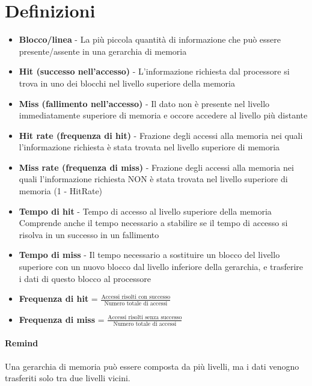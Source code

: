 \documentclass[12pt, a4paper, openany]{book}
\begin{document}
\section{Definizioni}
\begin{itemize}
    \item \textbf{Blocco/linea} - La più piccola quantità di informazione che può essere presente/assente in una gerarchia
    di memoria
    \item \textbf{Hit (successo nell'accesso)} - L'informazione richiesta dal processore si trova in uno dei 
    blocchi nel livello superiore della memoria
    \item \textbf{Miss (fallimento nell'accesso)} - Il dato non è presente nel livello immediatamente superiore
    di memoria e occore accedere al livello più distante
    \item \textbf{Hit rate (frequenza di hit)} - Frazione degli accessi alla memoria nei quali l'informazione
    richiesta è stata trovata nel livello superiore di memoria
    \item \textbf{Miss rate (frequenza di miss)} - Frazione degli accessi alla memoria nei quali l'informazione
    richiesta NON è stata trovata nel livello superiore di memoria (1 - HitRate)
    \item \textbf{Tempo di hit} - Tempo di accesso al livello superiore della memoria
    \\ Comprende anche il tempo necessario a stabilire se il tempo di accesso si risolva in un successo 
    in un fallimento
    \item \textbf{Tempo di miss} - Il tempo necessario a sostituire un blocco del livello superiore con un nuovo 
    blocco dal livello inferiore della gerarchia, e trasferire i dati di questo blocco al processore
    \item \textbf{Frequenza di hit} = $\frac{\mbox{Accessi risolti con successo}}{\mbox{Numero totale di accessi}}$
    \item \textbf{Frequenza di miss} = $\frac{\mbox{Accessi risolti senza successo}}{\mbox{Numero totale di accessi}}$
\end{itemize}

\paragraph*{Remind} Una gerarchia di memoria può essere composta da più livelli, ma i dati venogno trasferiti solo
tra due livelli vicini.
\end{document}
